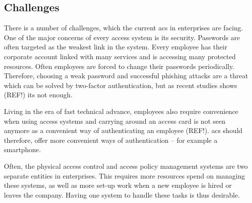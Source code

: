 \subsection{Challenges} \label{challenges}

There is a number of challenges, which the current \acrshort{acs} in enterprises are facing. One of the major concerns of every access system is its security. Passwords are often targeted as the weakest link in the system. Every employee has their corporate account linked with many services and is accessing many protected resources. Often employees are forced to change their passwords periodically. Therefore, choosing a weak password and successful phishing attacks are a threat which can be solved by two-factor authentication, but as recent studies shows 
(REF!) its not enough. 

Living in the era of fast technical advance, employees also require convenience when using access systems and carrying around an access card is not seen anymore as a convenient way of authenticating an employee 
(REF!). \acrshort{acs} should therefore, offer more convenient ways of authentication -- for example a smartphone.

Often, the physical access control and access policy management systems are two separate entities in enterprises. This requires more resources spend on managing these systems, as well as more set-up work when a new employee is hired or leaves the company. Having one system to handle these tasks is thus desirable.
